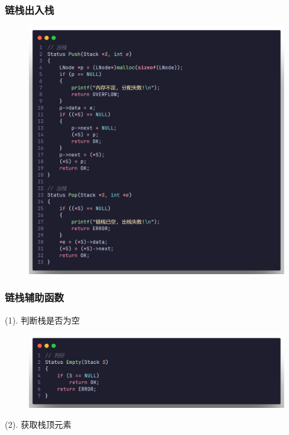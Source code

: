 \subsubsection{链栈出入栈}

\begin{figure}[H]
    \centering
    \includegraphics[scale=0.2]{"figure/Note/Stack/SlP.png"}
\end{figure}

\subsubsection{链栈辅助函数}

(1). 判断栈是否为空

\begin{figure}[H]
    \centering
    \includegraphics[scale=0.2]{"figure/Note/Stack/SlEmpty.png"}
\end{figure}

(2). 获取栈顶元素

